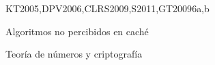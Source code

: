 \begin{syllabus}
\begin{unit}{\ALFundamentalDataStructuresandAlgorithms}{}{KT2005,DPV2006,CLRS2009,S2011,GT2009}{6}{a,b}
\begin{topics}%
    \item \ALFundamentalDataStructuresandAlgorithmsTopicGraphsAnd %
    \item Algoritmos no percibidos en caché 
    \item Teoría de números y criptografía
\end{topics}
\begin{learningoutcomes}
    \item \ALFundamentalDataStructuresandAlgorithmsLODiscussFactors [\Familiarity] %
    \item \ALFundamentalDataStructuresandAlgorithmsLOSolveProblems [\Assessment] %
    \item \ALFundamentalDataStructuresandAlgorithmsLODemonstrate [\Assessment] %
    \item \ALFundamentalDataStructuresandAlgorithmsLOSolveProblemsAlgorithms [\Assessment] %
\end{learningoutcomes}
\end{unit}


\end{syllabus}
